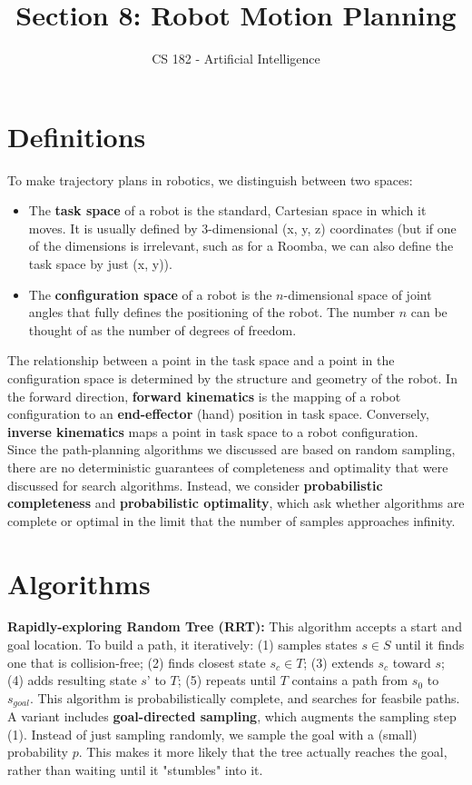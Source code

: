 \documentclass[11pt]{article}
\title{Section 8: Robot Motion Planning}
\author{CS 182 - Artificial Intelligence}
\date{}
\begin{document}
\maketitle

\renewcommand{\labelenumii}{\arabic{enumii}.}
\setlength{\parindent}{0pt}



\section{Definitions}

To make trajectory plans in robotics, we distinguish between two spaces:
\begin{itemize}
\item The {\bf{task space}} of a robot is the standard, Cartesian space in which it moves. It is usually defined by 3-dimensional (x, y, z) coordinates (but if one of the dimensions is irrelevant, such as for a Roomba, we can also define the task space by just (x, y)).
\item The {\bf{configuration space}} of a robot is the $n$-dimensional space of joint angles that fully defines the positioning of the robot. The number $n$ can be thought of as the number of degrees of freedom.
\end{itemize}

The relationship between a point in the task space and a point in the configuration space is determined by the structure and geometry of the robot. In the forward direction, {\bf{forward kinematics}} is the mapping of a robot configuration to an {\bf{end-effector}} (hand) position in task space. Conversely, {\bf{inverse kinematics}} maps a point in task space to a robot configuration. \\

Since the path-planning algorithms we discussed are based on random sampling, there are no deterministic guarantees of completeness and optimality that were discussed for search algorithms. Instead, we consider {\bf{probabilistic completeness}} and {\bf{probabilistic optimality}}, which ask whether algorithms are complete or optimal in the limit that the number of samples approaches infinity.


\section{Algorithms}

{\bf{Rapidly-exploring Random Tree (RRT):}} This algorithm accepts a start and goal location. To build a path, it iteratively: (1) samples states $s \in S$ until it finds one that is collision-free; (2) finds closest state $s_c \in T$; (3) extends $s_c$ toward $s$; (4) adds resulting state $s’$ to $T$; (5) repeats until $T$ contains a path from $s_0$ to $s_{goal}$. This algorithm is probabilistically complete, and searches for feasbile paths. A variant includes {\bf{goal-directed sampling}}, which augments the sampling step (1). Instead of just sampling randomly, we sample the goal with a (small) probability $p$. This makes it more likely that the tree actually reaches the goal, rather than waiting until it "stumbles" into it.\\
\end{document}
